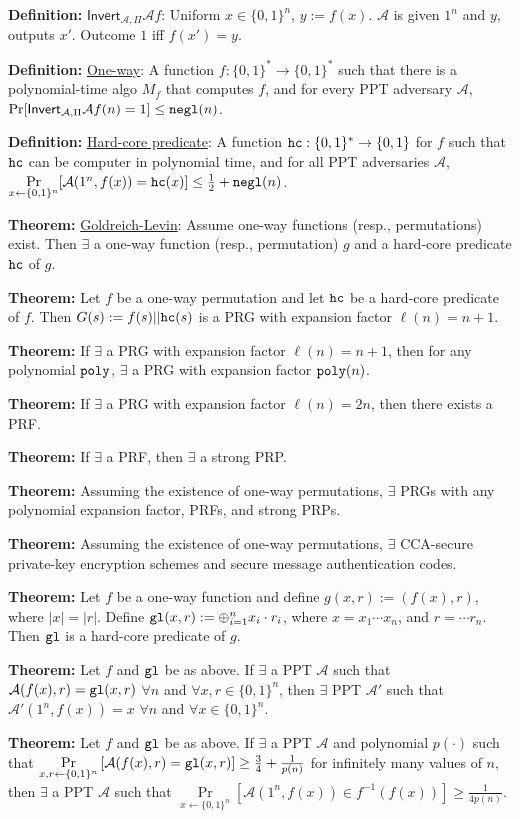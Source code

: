 \documentclass[10pt]{article}
\newcommand{\AAA}{\mathcal{A}}
\newcommand{\defn}[1]{{\bf Definition:} \underline{#1}}
\newcommand{\thm}[1]{{\bf Theorem:} \underline{#1}}
\newcommand{\ExptInvtArgs}{\mathsf{Invert}_{\AAA,\Pi}}
\newcommand{\ExptInvt}{\ExptInvtArgs{\AAA}{f}}
\newcommand{\xor}{\oplus}
\newcommand{\negl}{{\tt negl}}
\newcommand{\poly}{{\tt poly}}
\newcommand{\hc}{{\tt hc}}
\newcommand{\gl}{{\tt gl}}
\newcommand{\from}{\leftarrow}
\begin{document}
\begin{multicols}{5}
\defn{$\ExptInvt$}: Uniform $x\in\{0,1\}^n$, $y:=f(x)$. $\AAA$ is given $1^n$ and $y$, outputs $x'$. Outcome $1$ iff $f(x')=y$.

\defn{One-way}: A function $f:\{0,1\}^*\to\{0,1\}^*$ such that there is a polynomial-time algo $M_f$ that computes $f$, and for every PPT adversary $\AAA$, $\Pr[\ExptInvt(n)=1]\leq\negl(n)$.

\defn{Hard-core predicate}: A function $\hc:\{0,1\}^*\to\{0,1\}$ for $f$ such that $\hc$ can be computer in polynomial time, and for all PPT adversaries $\AAA$, $\Pr\limits_{x\from\{0,1\}^n}[\AAA(1^n,f(x))=\hc(x)]\leq\frac{1}{2}+\negl(n)$.

\thm{Goldreich-Levin}: Assume one-way functions (resp., permutations) exist. Then $\exists$ a one-way function (resp., permutation) $g$ and a hard-core predicate $\hc$ of $g$.

\thm{}Let $f$ be a one-way permutation and let $\hc$ be a hard-core predicate of $f$. Then $G(s):=f(s)||\hc(s)$ is a PRG with expansion factor $\ell(n)=n+1$.

\thm{}If $\exists$ a PRG with expansion factor $\ell(n)=n+1$, then for any polynomial $\poly$, $\exists$ a PRG with expansion factor $\poly(n)$.

\thm{}If $\exists$ a PRG with expansion factor $\ell(n)=2n$, then there exists a PRF.

\thm{}If $\exists$ a PRF, then $\exists$ a strong PRP.

\thm{}Assuming the existence of one-way permutations, $\exists$ PRGs with any polynomial expansion factor, PRFs, and strong PRPs.

\thm{}Assuming the existence of one-way permutations, $\exists$ CCA-secure private-key encryption schemes and secure message authentication codes.

\thm{}Let $f$ be a one-way function and define $g(x,r):=(f(x),r)$, where $|x|=|r|$. Define $\gl(x,r):=\xor_{i=1}^{n}x_i\cdot r_i$, where $x=x_1\cdots x_n$, and $r=\cdots r_n$. Then $\gl$ is a hard-core predicate of $g$.

\thm{}Let $f$ and $\gl$ be as above. If $\exists$ a PPT $\AAA$ such that $\AAA(f(x),r)=\gl(x,r)$ $\forall n$ and $\forall x,r\in\{0,1\}^n$, then $\exists$ PPT $\AAA'$ such that $\AAA'(1^n,f(x))=x$ $\forall n$ and $\forall x\in\{0,1\}^n$.

\thm{}Let $f$ and $\gl$ be as above. If $\exists$ a PPT $\AAA$ and polynomial $p(\cdot)$ such that $\Pr\limits_{x,r\from\{0,1\}^n}\left[\AAA(f(x),r)=\gl(x,r)\right]\geq\frac{3}{4}+\frac{1}{p(n)}$ for infinitely many values of $n$, then $\exists$ a PPT $\AAA$ such that $\Pr\limits_{x\from\{0,1\}^n}\left[\AAA(1^n,f(x))\in f^{-1}(f(x))\right]\geq\frac{1}{4p(n)}$.


\end{multicols}
\end{document}
